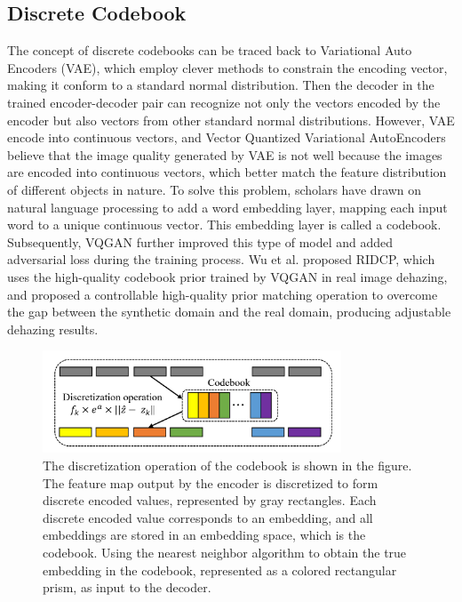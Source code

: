 \documentclass[lettersize,journal]{IEEEtran}
\begin{document}
\subsection{Discrete Codebook}
The concept of discrete codebooks can be traced back to Variational Auto Encoders (VAE)\cite{kingma2013auto}, which employ clever methods to constrain the encoding vector, making it conform to a standard normal distribution. Then the decoder in the trained encoder-decoder pair can recognize not only the vectors encoded by the encoder but also vectors from other standard normal distributions. However, VAE encode into continuous vectors, and Vector Quantized Variational AutoEncoders\cite{van2017neural} believe that the image quality generated by VAE is not well because the images are encoded into continuous vectors, which better match the feature distribution of different objects in nature. To solve this problem, scholars have drawn on natural language processing to add a word embedding layer, mapping each input word to a unique continuous vector. This embedding layer is called a codebook. Subsequently, VQGAN\cite{esser2021taming} further improved this type of model and added adversarial loss during the training process. Wu et al.\cite{wu2023ridcp} proposed RIDCP, which uses the high-quality codebook prior trained by VQGAN in real image dehazing, and proposed a controllable high-quality prior matching operation to overcome the gap between the synthetic domain and the real domain, producing adjustable dehazing results.

\begin{figure}[!t]
	\centering
	\includegraphics[width=3.5in]{discretization_operation}
	\caption{The discretization operation of the codebook is shown in the figure. The feature map output by the encoder is discretized to form discrete encoded values, represented by gray rectangles. Each discrete encoded value corresponds to an embedding, and all embeddings are stored in an embedding space, which is the codebook. Using the nearest neighbor algorithm to obtain the true embedding in the codebook, represented as a colored rectangular prism, as input to the decoder.}
	\label{fig2}
\end{figure}
\end{document}
